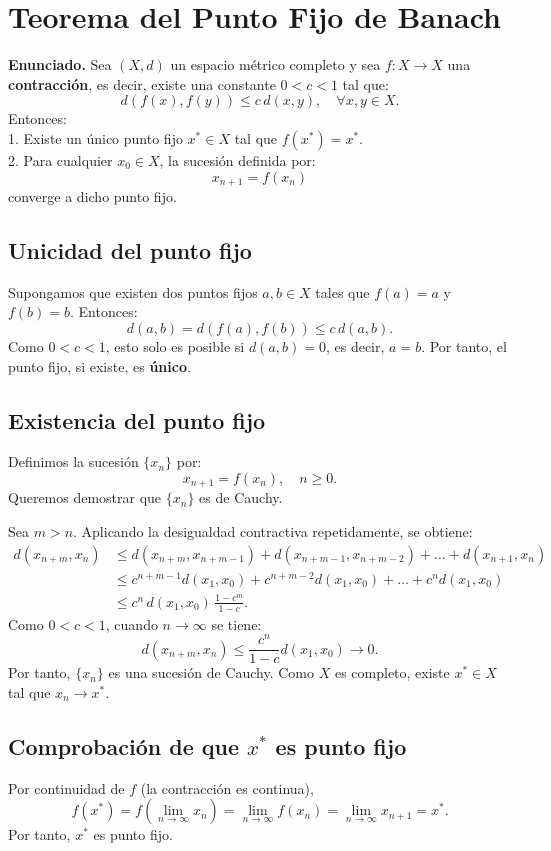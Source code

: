 \documentclass[12pt]{article}
\begin{document}
\section*{Teorema del Punto Fijo de Banach}

\textbf{Enunciado.}  
Sea $(X,d)$ un espacio métrico completo y sea $f:X\to X$ una \textbf{contracción}, es decir,
existe una constante $0 < c < 1$ tal que:
\[
d(f(x),f(y)) \leq c\,d(x,y), \quad \forall x,y\in X.
\]
Entonces:\\
1. Existe un único punto fijo $x^*\in X$ tal que $f(x^*)=x^*$. \\
2. Para cualquier $x_0\in X$, la sucesión definida por:
\[
x_{n+1}=f(x_n)
\]
converge a dicho punto fijo.

\subsection*{Unicidad del punto fijo}
Supongamos que existen dos puntos fijos $a,b\in X$ tales que $f(a)=a$ y $f(b)=b$.  
Entonces:
\[
d(a,b) = d(f(a),f(b)) \leq c\,d(a,b).
\]
Como $0<c<1$, esto solo es posible si $d(a,b)=0$, es decir, $a=b$.  
Por tanto, el punto fijo, si existe, es \textbf{único}.

\subsection*{Existencia del punto fijo}
Definimos la sucesión $\{x_n\}$ por:
\[
x_{n+1} = f(x_n), \quad n\ge 0.
\]
Queremos demostrar que $\{x_n\}$ es de Cauchy.

Sea $m>n$.  
Aplicando la desigualdad contractiva repetidamente, se obtiene:
\[
\begin{aligned}
d(x_{n+m},x_n)
&\le d(x_{n+m},x_{n+m-1}) + d(x_{n+m-1},x_{n+m-2}) + \dots + d(x_{n+1},x_n) \\
&\le c^{n+m-1}d(x_1,x_0) + c^{n+m-2}d(x_1,x_0) + \dots + c^n d(x_1,x_0) \\
&\le c^n\,d(x_1,x_0)\,\frac{1-c^m}{1-c}.
\end{aligned}
\]
Como $0<c<1$, cuando $n\to\infty$ se tiene:
\[
d(x_{n+m},x_n) \le \frac{c^n}{1-c}d(x_1,x_0) \longrightarrow 0.
\]
Por tanto, $\{x_n\}$ es una sucesión de Cauchy.  
Como $X$ es completo, existe $x^*\in X$ tal que $x_n\to x^*$.

\subsection*{Comprobación de que $x^*$ es punto fijo}
Por continuidad de $f$ (la contracción es continua),
\[
f(x^*) = f\left(\lim_{n\to\infty}x_n\right)
= \lim_{n\to\infty} f(x_n)
= \lim_{n\to\infty} x_{n+1}
= x^*.
\]
Por tanto, $x^*$ es punto fijo.  
\end{document}
